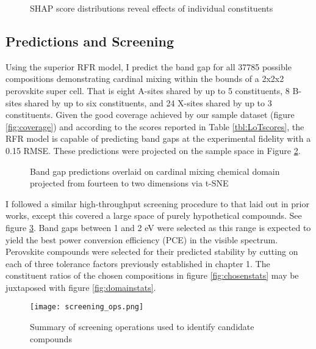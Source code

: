  
\begin{figure}[htbp]
\centering

\caption{\label{fig:clusters} SHAP score distributions reveal effects of individual constituents}
\end{figure}

\subsection{Predictions and Screening}
\label{sec:org37dcca4}
Using the superior RFR model, I predict the band gap for all 37785 possible compositions demonstrating cardinal mixing within the bounds of a 2x2x2 perovskite super cell.
That is eight A-sites shared by up to 5 constituents, 8 B-sites shared by up to six constituents, and 24 X-sites shared by up to 3 constituents.
Given the good coverage achieved by our sample dataset (figure \ref{fig:coverage}) and according to the scores reported in Table \ref{tbl:LoTscores}, the RFR model is capable of predicting band gaps at the experimental fidelity with a 0.15 RMSE.
These predictions were projected on the sample space in Figure \ref{fig:pred}.

 
\begin{figure}[htbp]
\centering

\caption{\label{fig:pred} Band gap predictions overlaid on cardinal mixing chemical domain projected from fourteen to two dimensions via t-SNE}
\end{figure}

I followed a similar high-throughput screening procedure to that laid out in prior works, except this covered a large space of purely hypothetical compounds.
\autocite{yang-2023-high-throug,mannodi-kanakkithodi-2021-comput-data}
See figure \ref{fig:screenops}.
Band gaps between 1 and 2 \unit{\electronvolt} were selected as this range is expected to yield the best power conversion efficiency (PCE) in the visible spectrum.
\autocite{yu-2012-ident-poten,shockley-1961-detail-balan}
Perovskite compounds were selected for their predicted stability by cutting on each of three tolerance factors previously established in chapter 1.
The constituent ratios of the chosen compositions in figure \ref{fig:chosenstats} may be juxtaposed with figure \ref{fig:domainstats}.

\begin{figure}[htbp]
\centering
\texttt{[image: screening\_ops.png]}
\caption{\label{fig:screenops} Summary of screening operations used to identify candidate compounds}
\end{figure}

